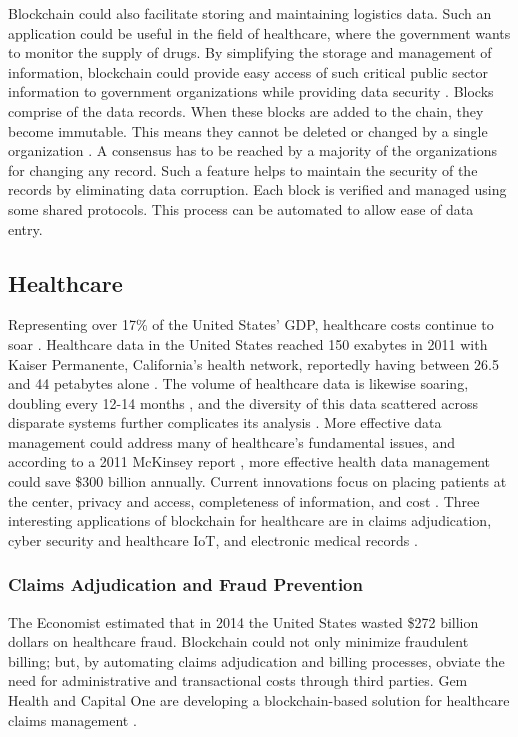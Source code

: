 \documentclass[sigconf]{acmart}
\begin{document}
Blockchain could also facilitate storing and maintaining logistics data. Such an application could be useful in the field of healthcare, where the government wants to monitor the supply of drugs. By simplifying the storage and management of information, blockchain could provide easy access of such critical public sector information to government organizations while providing data security \cite{arbc2}. Blocks comprise of the data records. When these blocks are added to the chain, they become immutable. This means they cannot be deleted or changed by a single organization \cite{arbc2}. A consensus has to be reached by a majority of the organizations for changing any record. Such a feature helps to maintain the security of the records by eliminating data corruption. Each block is verified and managed using some shared protocols. This process can be automated to allow ease of data entry.

\subsection{Healthcare}
Representing over 17\% of the United States' GDP, healthcare costs continue to soar \cite{hitchingHealthcare}. Healthcare data in the United States reached 150 exabytes in 2011 with Kaiser Permanente, California's health network, reportedly having between 26.5 and 44 petabytes alone \cite{cottle2013transforming}. The volume of healthcare data is likewise soaring, doubling every 12-14 months \cite{dinov2016volume}, and the diversity of this data scattered across disparate systems further complicates its analysis \cite{frost2015drowning}. More effective data management could address many of healthcare's fundamental issues, and according to a 2011 McKinsey report \cite{mckinsey2011}, more effective health data management could save \$300 billion annually. Current innovations focus on placing patients at the center, privacy and access, completeness of information, and cost \cite{hitchingHealthcare}. Three interesting applications of blockchain for healthcare are in claims adjudication, cyber security and healthcare IoT, and electronic medical records \cite{das2017}.

\subsubsection{Claims Adjudication and Fraud Prevention}
The Economist \cite{economist2014} estimated that in 2014 the United States wasted \$272 billion dollars on healthcare fraud. Blockchain could not only minimize fraudulent billing; but, by automating claims adjudication and billing processes, obviate the need for administrative and transactional costs through third parties. Gem Health and Capital One are developing a blockchain-based solution for healthcare claims management \cite{das2017}.
\end{document}

